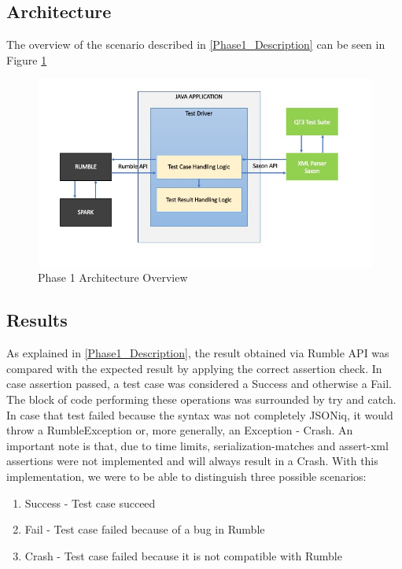 \subsection{Architecture}
The overview of the scenario described in \ref{Phase1_Description} can be seen in Figure \ref{fig:Phase1_Architecture}
 \begin{figure}[h!]
 	\vspace*{-5mm}
 	\includegraphics[width=\linewidth]{architecture_diagram_phase_1.jpeg}
 	\vspace*{-15mm}
 	\caption{Phase 1 Architecture Overview}
 	\label{fig:Phase1_Architecture}
 \end{figure}

\vspace*{-5mm}
\subsection{Results}

\label{Phase1_Results}
As explained in \ref{Phase1_Description}, the result obtained via Rumble API was compared with the expected result by applying the correct assertion check. In case assertion passed, a test case was considered a Success and otherwise a Fail. The block of code performing these operations was surrounded by try and catch. In case that test failed because the syntax was not completely JSONiq, it would throw a RumbleException or, more generally, an Exception - Crash. An important note is that, due to time limits, serialization-matches and assert-xml assertions were not implemented and will always result in a Crash. With this implementation, we were to be able to distinguish three possible scenarios:

\begin{enumerate}
	\item Success - Test case succeed
	\item Fail - Test case failed because of a bug in Rumble
	\item Crash - Test case failed because it is not compatible with Rumble
\end{enumerate}

